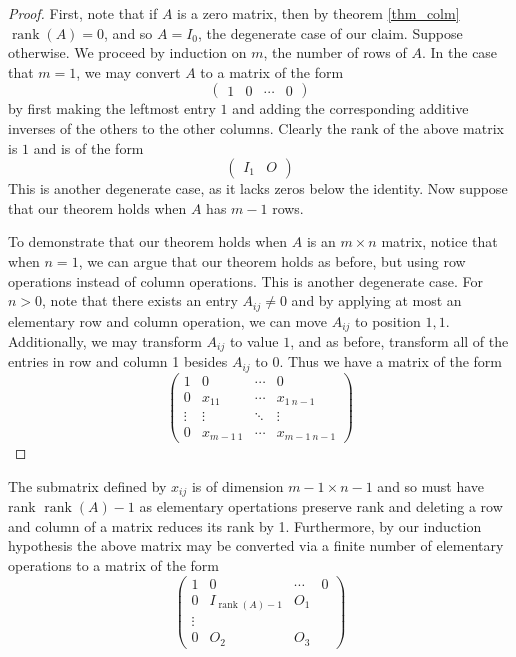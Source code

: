 \documentclass[oneside, 12pt]{book}
\DeclareMathOperator{\rank}{rank}
\theoremstyle{definition}
\begin{document}
\begin{proof}
  First, note that if $A$ is a zero matrix, then by theorem \ref{thm_colm} $\rank(A)=0$, and so $A=I_{0}$, the degenerate case of our claim.
  Suppose otherwise.
  We proceed by induction on $m$, the number of rows of $A$. In the case that $m=1$, we may convert $A$ to a matrix of the form
  \[\begin{pmatrix}
      1 & 0 & \cdots & 0
    \end{pmatrix}\] by first making the leftmost entry $1$ and adding the corresponding additive inverses of the others to the other columns.
  Clearly the rank of the above matrix is $1$ and is of the form
  \[\begin{pmatrix}
I_{1} & O
    \end{pmatrix}\]
  This is another degenerate case, as it lacks zeros below the identity.
  Now suppose that our theorem holds when $A$ has $m-1$ rows.

  To demonstrate that our theorem holds when $A$ is an $m \times n$ matrix, notice that when $n=1$, we can argue that our theorem holds as before, but
  using row operations instead of column operations. This is another degenerate case. For $n>0$, note that there exists an entry $A_{ij}\neq0$
  and by applying at most an elementary row and column operation, we can move $A_{ij}$ to position $1,1$. Additionally, we may transform $A_{ij}$ to
  value $1$, and as before, transform all of the entries in row and column 1 besides $A_{ij}$ to $0$. Thus we have a matrix of the form
  \[\begin{pmatrix}
      1 & 0 & \cdots & 0 \\
      0 & x_{11} & \cdots & x_{1 \ n-1}       \\
      \vdots & \vdots & \ddots &  \vdots  \\
      0 & x_{m-1 \ 1}& \cdots & x_{m-1 \ n-1}
    \end{pmatrix}\]
\end{proof}
The submatrix defined by $x_{ij}$ is of dimension $m-1 \times n-1$ and so must have rank $\rank(A)-1$ as elementary opertations preserve rank and deleting a row and column of a matrix reduces its rank by 1. Furthermore, by our induction hypothesis the above matrix may be converted via a finite number
of elementary operations to a matrix of the form
\[\begin{pmatrix}
    1 & 0 & \cdots & 0 \\
    0 & I_{\rank(A)-1} & O_{1} \\
    \vdots &  &   \\
    0 & O_{2} & O_{3}
  \end{pmatrix}\]
\end{document}
